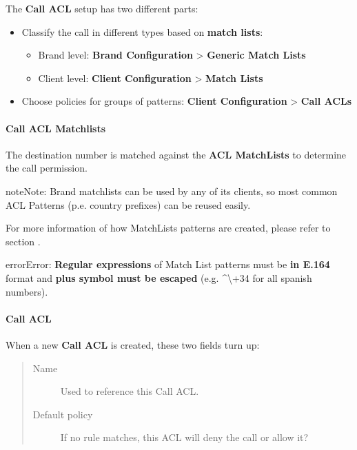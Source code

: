 \documentclass[letterpaper,10pt,english]{sphinxmanual}
\begin{document}
The \textbf{Call ACL} setup has two different parts:
\begin{itemize}
\item {} 
Classify the call in different types based on \textbf{match lists}:
\begin{itemize}
\item {} 
Brand level: \textbf{Brand Configuration} \textgreater{} \textbf{Generic Match Lists}

\item {} 
Client level: \textbf{Client Configuration} \textgreater{} \textbf{Match Lists}

\end{itemize}

\item {} 
Choose policies for groups of patterns: \textbf{Client Configuration} \textgreater{} \textbf{Call
ACLs}

\end{itemize}


\paragraph{Call ACL Matchlists}
\label{administration_portal/client/vpbx/user_configuration/call_acls:call-acl-matchlists}
The destination number is matched against the \textbf{ACL MatchLists} to determine
the call permission.

\begin{notice}{note}{Note:}
Brand matchlists can be used by any of its clients, so most common
ACL Patterns (p.e. country prefixes) can be reused easily.
\end{notice}

For more information of how MatchLists patterns are created, please refer to section
{\hyperref[administration_portal/client/vpbx/routing_tools/match_lists:match\string-lists]{}}.

\begin{notice}{error}{Error:}
\textbf{Regular expressions} of Match List patterns must be \textbf{in E.164} format and \textbf{plus symbol must be
escaped} (e.g. \textasciicircum{}\textbackslash{}+34 for all spanish numbers).
\end{notice}


\paragraph{Call ACL}
\label{administration_portal/client/vpbx/user_configuration/call_acls:call-acl}
When a new \textbf{Call ACL} is created, these two fields turn up:
\begin{quote}
\begin{description}
\item[{Name}] \leavevmode
Used to reference this Call ACL.

\item[{Default policy}] \leavevmode
If no rule matches, this ACL will deny the call or allow it?

\end{description}
\end{quote}
\end{document}
